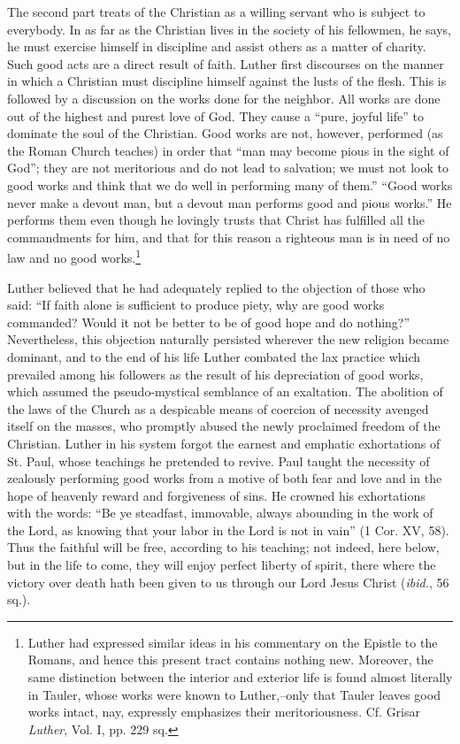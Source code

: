 The second part treats of the Christian as a willing servant who is subject
to everybody. In as far as the Christian lives in the society of his fellowmen,
he says, he must exercise himself in discipline and assist others as a
matter of charity. Such good acts are a direct result of faith. Luther first
discourses on the manner in which a Christian must discipline himself against
the lusts of the flesh. This is followed by a discussion on the works
done for the neighbor. All works are done out of the highest and purest
love of God. They cause a “pure, joyful life” to dominate the soul of the
Christian. Good works are not, however, performed (as the Roman Church
teaches) in order that “man may become pious in the sight of God”; they
are not meritorious and do not lead to salvation; we must not look to good
works and think that we do well in performing many of them.” “Good
works never make a devout man, but a devout man performs good and
pious works.” He performs them even though he lovingly trusts that Christ
has fulfilled all the commandments for him, and that for this reason a
righteous man is in need of no law and no good works.\footnote
{Luther had expressed similar ideas in his commentary on the Epistle to the Romans,
and hence this present tract contains nothing new. Moreover, the same distinction between
the interior and exterior life is found almost literally in Tauler, whose works were known
to Luther,--only that Tauler leaves good works intact, nay, expressly emphasizes their
meritoriousness. Cf. Grisar \textit{Luther}, Vol. I, pp. 229 sq.}

Luther believed that he had adequately replied to the objection of
those who said: “If faith alone is sufficient to produce piety, why are
good works commanded? Would it not be better to be of good hope
and do nothing?” Nevertheless, this objection naturally persisted
wherever the new religion became dominant, and to the end of his
life Luther combated the lax practice which prevailed among his followers
as the result of his depreciation of good works, which assumed
the pseudo-mystical semblance of an exaltation. The abolition of the
laws of the Church as a despicable means of coercion of necessity
avenged itself on the masses, who promptly abused the newly proclaimed
freedom of the Christian. Luther in his system forgot the
earnest and emphatic exhortations of St. Paul, whose teachings he
pretended to revive. Paul taught the necessity of zealously performing
good works from a motive of both fear and love and in the hope
of heavenly reward and forgiveness of sins. He crowned his exhortations
with the words: “Be ye steadfast, immovable, always abounding in the work
of the Lord, as knowing that your labor in the Lord
is not in vain” (1 Cor. XV, 58). Thus the faithful will be free, according
to his teaching; not indeed, here below, but in the life to
come, they will enjoy perfect liberty of spirit, there where the victory
over death hath been given to us through our Lord Jesus Christ
(\textit{ibid.}, 56 sq.).

